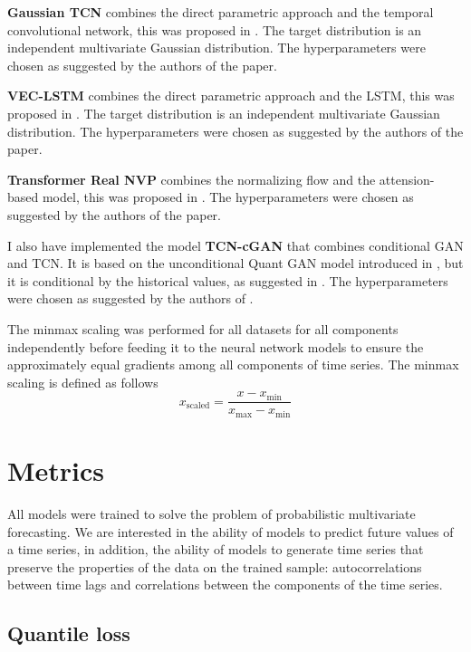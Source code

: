 \documentclass[12pt,a4paper]{article}
\begin{document}
\textbf{Gaussian TCN} combines the direct parametric approach and the temporal convolutional network, this was proposed in \cite{gaussiantcn2020}. The target distribution is an independent multivariate Gaussian distribution. The hyperparameters were chosen as suggested by the authors of the paper.

\textbf{VEC-LSTM} combines the direct parametric approach and the LSTM, this was proposed in \cite{Salinas2019HighDimensionalMF}. The target distribution is an independent multivariate Gaussian distribution. The hyperparameters were chosen as suggested by the authors of the paper.

\textbf{Transformer Real NVP} combines the normalizing flow and the attension-based model, this was proposed in \cite{normflow2021}. The hyperparameters were chosen as suggested by the authors of the paper.

I also have implemented the model \textbf{TCN-cGAN} that combines conditional GAN and TCN. It is based on the unconditional Quant GAN model introduced in \cite{quantgan2020}, but it is conditional by the historical values, as suggested in \cite{koochali2020like}. The hyperparameters were chosen as suggested by the authors of \cite{quantgan2020}.

The minmax scaling was performed for all datasets for all components independently before feeding it to the neural network models to ensure the approximately equal gradients among all components of time series. The minmax scaling is defined as follows
$$x_\text{scaled} = \frac{x-x_{\min}}{x_{\max} - x_{\min}}$$

\section{Metrics}

All models were trained to solve the problem of probabilistic multivariate forecasting. We are interested in the ability of models to predict future values of a time series, in addition, the ability of models to generate time series that preserve the properties of the data on the trained sample: autocorrelations between time lags and correlations between the components of the time series.

\subsection{Quantile loss}
\end{document}
